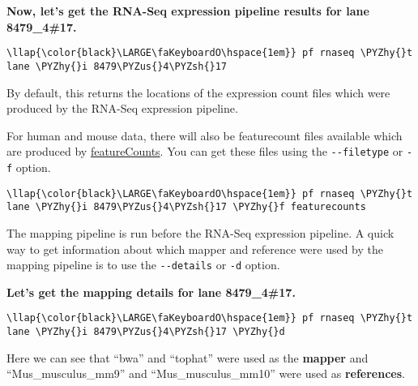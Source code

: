 \documentclass[11pt]{article}
\def\PYZus{\char`\_}
\def\PYZsh{\char`\#}
\def\PYZhy{\char`\-}
\begin{document}
    \textbf{Now, let's get the RNA-Seq expression pipeline results for lane
8479\_4\#17.}

\begin{terminalinput}
\begin{Verbatim}[commandchars=\\\{\}]
\llap{\color{black}\LARGE\faKeyboardO\hspace{1em}} pf rnaseq \PYZhy{}t lane \PYZhy{}i 8479\PYZus{}4\PYZsh{}17
\end{Verbatim}
\end{terminalinput}

    By default, this returns the locations of the expression count files
which were produced by the RNA-Seq expression pipeline.

For human and mouse data, there will also be featurecount files
available which are produced by
\href{http://bioinf.wehi.edu.au/featureCounts/}{featureCounts}. You can
get these files using the \texttt{-\/-filetype} or \texttt{-f} option.

\begin{terminalinput}
\begin{Verbatim}[commandchars=\\\{\}]
\llap{\color{black}\LARGE\faKeyboardO\hspace{1em}} pf rnaseq \PYZhy{}t lane \PYZhy{}i 8479\PYZus{}4\PYZsh{}17 \PYZhy{}f featurecounts
\end{Verbatim}
\end{terminalinput}

    The mapping pipeline is run before the RNA-Seq expression pipeline. A
quick way to get information about which mapper and reference were used
by the mapping pipeline is to use the \texttt{-\/-details} or
\texttt{-d} option.



\newpage



\textbf{Let's get the mapping details for lane 8479\_4\#17.}

\begin{terminalinput}
\begin{Verbatim}[commandchars=\\\{\}]
\llap{\color{black}\LARGE\faKeyboardO\hspace{1em}} pf rnaseq \PYZhy{}t lane \PYZhy{}i 8479\PYZus{}4\PYZsh{}17 \PYZhy{}d
\end{Verbatim}
\end{terminalinput}

    Here we can see that ``bwa'' and ``tophat'' were used as the
\textbf{mapper} and ``Mus\_musculus\_mm9'' and ``Mus\_musculus\_mm10''
were used as \textbf{references}.
\end{document}
